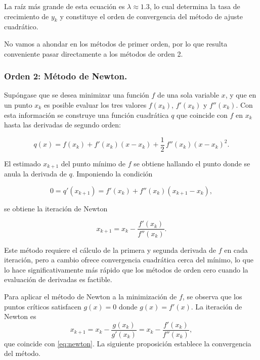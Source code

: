 \documentclass[11pt]{article}
\theoremstyle{ejstyle}
\theoremstyle{ejstyle}
\theoremstyle{ejstyle}
\theoremstyle{ejstyle}
\theoremstyle{ejstyle}
\theoremstyle{ejstyle}
\theoremstyle{ejstyle}
\begin{document}
	La raíz más grande de esta ecuación es $\lambda \approx 1.3$, lo cual determina la tasa de crecimiento de $y_k$ y constituye el orden de convergencia del método de ajuste cuadrático.
	
	No vamos a ahondar en los métodos de primer orden, por lo que resulta conveniente pasar directamente a los métodos de orden 2.
	
	\subsubsection{Orden 2: Método de Newton.}
	
	Supóngase que se desea minimizar una función $f$ de una sola variable $x$, y que en un punto $x_k$ es posible evaluar los tres valores $f(x_k)$, $f'(x_k)$ y $f''(x_k)$. Con esta información se construye una función cuadrática $q$ que coincide con $f$ en $x_k$ hasta las derivadas de segundo orden:
	
	\begin{equation}
		q(x) = f(x_k) + f'(x_k)(x - x_k) + \frac{1}{2}\,f''(x_k)(x - x_k)^2.
		\label{eq:8.20}
	\end{equation}
	
	El estimado $x_{k+1}$ del punto mínimo de $f$ se obtiene hallando el punto donde se anula la derivada de $q$. Imponiendo la condición
	
	\begin{equation}
		0 = q'(x_{k+1}) = f'(x_k) + f''(x_k)(x_{k+1} - x_k),
	\end{equation}
	
	se obtiene la iteración de Newton
	
	\begin{equation}
		x_{k+1} = x_k - \frac{f'(x_k)}{f''(x_k)}.
		\label{eq:newton}
	\end{equation}
	
	Este método requiere el cálculo de la primera y segunda derivada de $f$ en cada iteración, pero a cambio ofrece convergencia cuadrática cerca del mínimo, lo que lo hace significativamente más rápido que los métodos de orden cero cuando la evaluación de derivadas es factible.
	
	Para aplicar el método de Newton a la minimización de $f$, se observa que los puntos críticos satisfacen $g(x) = 0$ donde $g(x) = f'(x)$. La iteración de Newton es
	\[
	x_{k+1} = x_k - \frac{g(x_k)}{g'(x_k)} = x_k - \frac{f'(x_k)}{f''(x_k)},
	\]
	que coincide con \eqref{eq:newton}. La siguiente proposición establece la convergencia del método.
	
\end{document}
